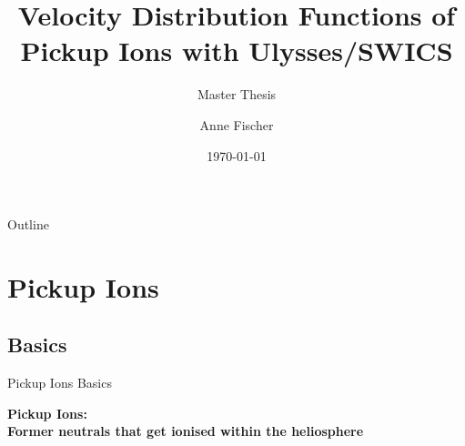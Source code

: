 \documentclass{beamer}
\title{Velocity Distribution Functions of Pickup Ions with Ulysses/SWICS}
\subtitle{Master Thesis}
\author{Anne Fischer}
\date{\today}
\begin{document}
\begin{frame}[plain]
	\titlepage
\end{frame}
\begin{frame}[plain]{Outline}
	
	\tableofcontents
\end{frame}
\section{Pickup Ions}
\subsection{Basics}
\begin{frame}{Pickup Ions Basics}
	\begin{block}{ }
		\textbf{Pickup Ions: \\
			Former neutrals that get ionised within the heliosphere}
	\end{block}


\end{frame}
\end{document}
